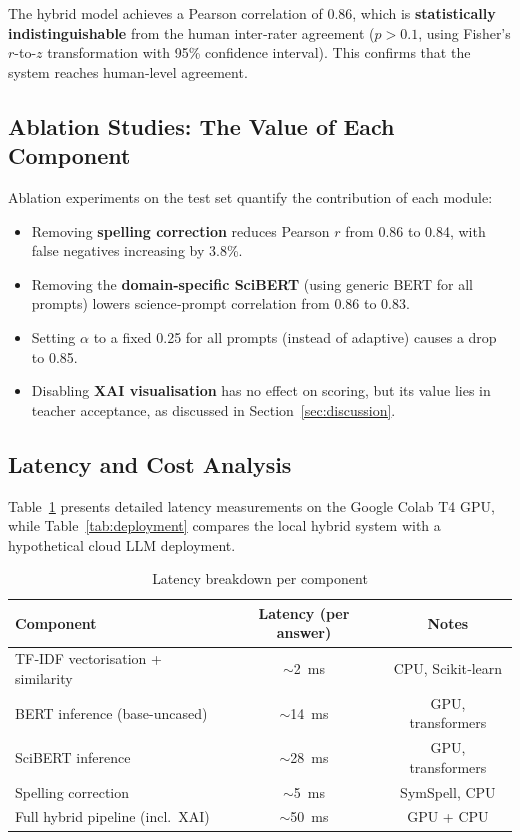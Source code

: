 \documentclass[11pt,a4paper]{article}
\begin{document}
The hybrid model achieves a Pearson correlation of $0.86$, which is \textbf{statistically indistinguishable} from the human inter‑rater agreement ($p > 0.1$, using Fisher's $r$-to-$z$ transformation with 95\% confidence interval). This confirms that the system reaches human‑level agreement.

\subsection{Ablation Studies: The Value of Each Component}
\label{sec:ablation}
Ablation experiments on the test set quantify the contribution of each module:
\begin{itemize}[noitemsep]
\item Removing \textbf{spelling correction} reduces Pearson $r$ from 0.86 to 0.84, with false negatives increasing by 3.8\%.
\item Removing the \textbf{domain‑specific SciBERT} (using generic BERT for all prompts) lowers science‑prompt correlation from 0.86 to 0.83.
\item Setting $\alpha$ to a fixed 0.25 for all prompts (instead of adaptive) causes a drop to 0.85.
\item Disabling \textbf{XAI visualisation} has no effect on scoring, but its value lies in teacher acceptance, as discussed in Section~\ref{sec:discussion}.
\end{itemize}

\subsection{Latency and Cost Analysis}
\label{sec:latency}
Table~\ref{tab:latency} presents detailed latency measurements on the Google Colab T4 GPU, while Table~\ref{tab:deployment} compares the local hybrid system with a hypothetical cloud LLM deployment.

\begin{table}[H]
\centering
\caption{Latency breakdown per component}
\label{tab:latency}
\begin{tabular}{lcc}
\toprule
\textbf{Component} & \textbf{Latency (per answer)} & \textbf{Notes} \\
\midrule
TF‑IDF vectorisation + similarity & $\sim$2~ms & CPU, Scikit‑learn \\
BERT inference (base-uncased) & $\sim$14~ms & GPU, transformers \\
SciBERT inference & $\sim$28~ms & GPU, transformers \\
Spelling correction & $\sim$5~ms & SymSpell, CPU \\
Full hybrid pipeline (incl.~XAI) & $\sim$50~ms & GPU + CPU \\
\bottomrule
\end{tabular}
\end{table}
\end{document}
